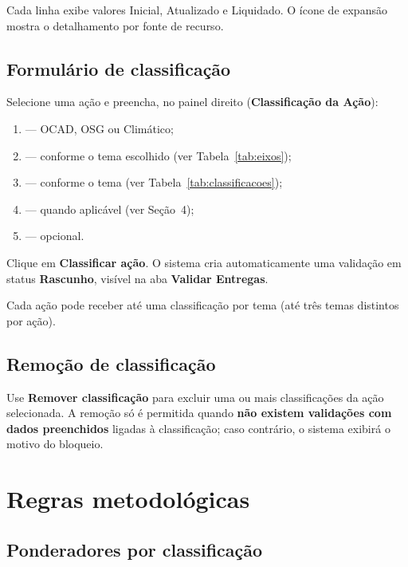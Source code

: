 \documentclass[11pt,a4paper]{article}
\begin{document}
Cada linha exibe valores Inicial, Atualizado e Liquidado. O ícone de expansão mostra o detalhamento por fonte de recurso.

\subsection{Formulário de classificação}

Selecione uma ação e preencha, no painel direito (\textbf{Classificação da Ação}):

\begin{enumerate}
  \item {} — OCAD, OSG ou Climático;
  \item {} — conforme o tema escolhido (ver Tabela~\ref{tab:eixos});
  \item {} — conforme o tema (ver Tabela~\ref{tab:classificacoes});
  \item {} — quando aplicável (ver Seção~4);
  \item {} — opcional.
\end{enumerate}

Clique em \textbf{Classificar ação}. O sistema cria automaticamente uma validação em status \textbf{Rascunho}, visível na aba \textbf{Validar Entregas}.

\begin{boxdica}
Cada ação pode receber até uma classificação por tema (até três temas distintos por ação).
\end{boxdica}

\subsection{Remoção de classificação}

Use \textbf{Remover classificação} para excluir uma ou mais classificações da ação selecionada. A remoção só é permitida quando \textbf{não existem validações com dados preenchidos} ligadas à classificação; caso contrário, o sistema exibirá o motivo do bloqueio.

\section{Regras metodológicas}

\subsection{Ponderadores por classificação}
\end{document}
